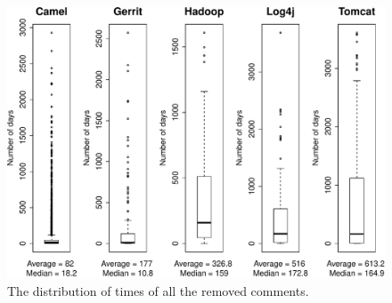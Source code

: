 


\begin{figure}[t]
	\centering
	\includegraphics[width=\columnwidth]{figures/test/distribution_.pdf}
	\caption{The distribution of times of all the removed \SATD comments.}
	\label{fig:removed_all_std_comments}
\end{figure}



